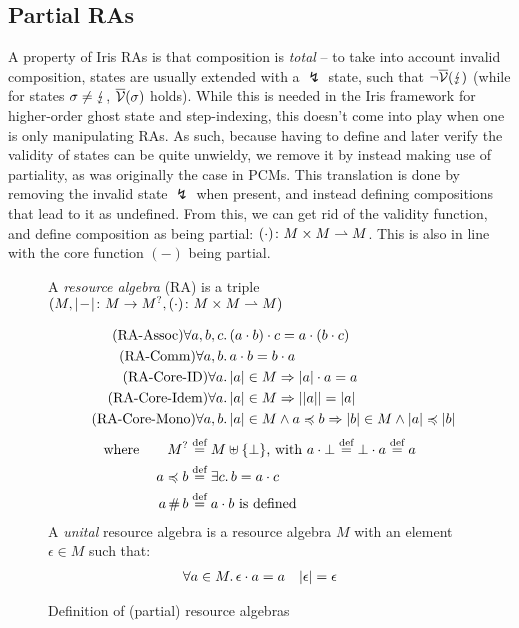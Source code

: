 \subsection{Partial RAs}

A property of Iris RAs is that composition is \emph{total} -- to take into account invalid composition, states are usually extended with a $\lightning$ state, such that $\neg \overline{\cal V}(\lightning)$ (while for states $\sigma\neq\lightning$, $\overline{\cal V}(\sigma)$ holds). While this is needed in the Iris framework for higher-order ghost state and step-indexing, this doesn't come into play when one is only manipulating RAs. As such, because having to define and later verify the validity of states can be quite unwieldy, we remove it by instead making use of partiality, as was originally the case in PCMs. This translation is done by removing the invalid state $\lightning$ when present, and instead defining compositions that lead to it as undefined. From this, we can get rid of the validity function, and define composition as being partial: $(\cdot)\colon M\times M\rightharpoonup M$. This is also in line with the core function $(-)$ being partial.

\begin{figure}
A \emph{resource algebra} (RA) is a triple $(M, |\!-\!|\colon M\rightarrow M^?, (\cdot)\colon M\times M \rightharpoonup M)$

\begin{align}
	\tag{RA-Assoc} \forall a,b,c&\ldotp (a\cdot b)\cdot c = a\cdot (b\cdot c)\\
	\tag{RA-Comm} \forall a,b&\ldotp a\cdot b = b\cdot a\\
	\tag{RA-Core-ID} \forall a&\ldotp |a| \in M \Rightarrow |a|\cdot a = a\\
	\tag{RA-Core-Idem} \forall a&\ldotp |a|\in M\Rightarrow ||a|| = |a|\\
	\tag{RA-Core-Mono} \forall a,b&\ldotp |a|\in M\land a\preccurlyeq b \Rightarrow |b| \in M \land |a| \preccurlyeq |b|
\end{align}
\begin{align*}
	\text{where}\qquad
	M^? &\stackrel{\textnormal{def}}= M \uplus \{\bot\}\text{, with }a\cdot \bot \stackrel{\textnormal{def}}= \bot\cdot a\stackrel{\textnormal{def}}= a\\
	a \preccurlyeq b &\stackrel{\textnormal{def}}= \exists c\ldotp b = a\cdot c\\
	a\operatorname{\#} b &\stackrel{\textnormal{def}}= a \cdot b \text{ is defined}
\end{align*}
A \emph{unital} resource algebra is a resource algebra $M$ with an element $\epsilon\in M$ such that:
\begin{align*}
	\forall a\in M\ldotp \epsilon\cdot a = a&&
	|\epsilon|=\epsilon
\end{align*}
\caption{Definition of (partial) resource algebras}
\label{fig:ra-properties}
\end{figure}

